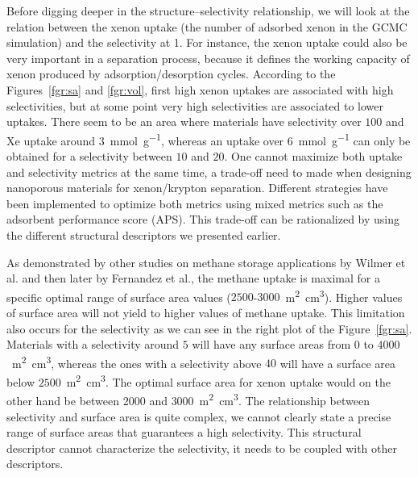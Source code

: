 \documentclass[main.tex]{subfiles}
\begin{document}
Before digging deeper in the structure--selectivity relationship, we will look at the relation between the xenon uptake (the number of adsorbed xenon in the GCMC simulation) and the selectivity at \SI{1}{\atm}. For instance, the xenon uptake could also be very important in a separation process, because it defines the working capacity of xenon produced by adsorption/desorption cycles. According to the Figures~\ref{fgr:sa} and \ref{fgr:vol}, first high xenon uptakes are associated with high selectivities, but at some point very high selectivities are associated to lower uptakes. There seem to be an area where materials have selectivity over $100$ and Xe uptake around \SI{3}{\milli\mole\per\gram}, whereas an uptake over \SI{6}{\milli\mole\per\gram} can only be obtained for a selectivity between $10$ and $20$. One cannot maximize both uptake and selectivity metrics at the same time, a trade-off need to made when designing nanoporous materials for xenon/krypton separation.\cite{Zhang_2022} Different strategies have been implemented to optimize both metrics using mixed metrics such as the adsorbent performance score (APS).\cite{Solanki_2020}
This trade-off can be rationalized by using the different structural descriptors we presented earlier. 


As demonstrated by other studies on methane storage applications by Wilmer et al.\cite{Wilmer_2012} and then later by Fernandez et al.\cite{Fernandez_2013}, the methane uptake is maximal for a specific optimal range of surface area values ($2500$-$3000$~\si{\square\meter\cubic\centi\meter}). Higher values of surface area will not yield to higher values of methane uptake. This limitation also occurs for the selectivity as we can see in the right plot of the Figure~\ref{fgr:sa}. Materials with a selectivity around $5$ will have any surface areas from $0$ to $4000$~\si{\square\meter\cubic\centi\meter}, whereas the ones with a selectivity above $40$ will have a surface area below $2500$~\si{\square\meter\cubic\centi\meter}. The optimal surface area for xenon uptake would on the other hand be between $2000$ and $3000$~\si{\square\meter\cubic\centi\meter}. The relationship between selectivity and surface area is quite complex, we cannot clearly state a precise range of surface areas that guarantees a high selectivity. This structural descriptor cannot characterize the selectivity, it needs to be coupled with other descriptors. 
\end{document}
